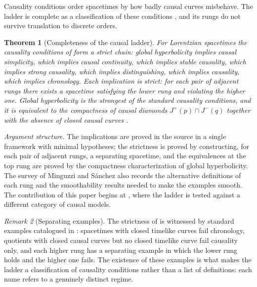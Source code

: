 \documentclass[11pt,letterpaper]{article}
\newtheorem{theorem}{Theorem}[section]
\theoremstyle{definition}
\theoremstyle{remark}
\newtheorem{remark}[theorem]{Remark}
\begin{document}
Causality conditions order spacetimes by how badly causal curves misbehave. The ladder is complete as a classification of these conditions \cite{minguzzisanchez}, and its rungs do not survive translation to discrete orders.

\begin{theorem}[Completeness of the causal ladder]\label{thm:ladder}
For Lorentzian spacetimes the causality conditions of  form a strict chain: global hyperbolicity implies causal simplicity, which implies causal continuity, which implies stable causality, which implies strong causality, which implies distinguishing, which implies causality, which implies chronology. Each implication is strict: for each pair of adjacent rungs there exists a spacetime satisfying the lower rung and violating the higher one. Global hyperbolicity is the strongest of the standard causality conditions, and it is equivalent to the compactness of causal diamonds $J^+(p) \cap J^-(q)$ together with the absence of closed causal curves \cite{minguzzisanchez}.
\end{theorem}

\par\medskip\noindent\emph{Argument structure.}
The implications are proved in the source in a single framework with minimal hypotheses; the strictness is proved by constructing, for each pair of adjacent rungs, a separating spacetime, and the equivalences at the top rung are proved by the compactness characterization of global hyperbolicity. The survey of Minguzzi and S\'{a}nchez also records the alternative definitions of each rung and the smoothability results needed to make the examples smooth. The contribution of this paper begins at , where the ladder is tested against a different category of causal models.
\par\medskip

\begin{remark}[Separating examples]\label{rem:separating}
The strictness of  is witnessed by standard examples catalogued in \cite{minguzzisanchez}: spacetimes with closed timelike curves fail chronology, quotients with closed causal curves but no closed timelike curve fail causality only, and each higher rung has a separating example in which the lower rung holds and the higher one fails. The existence of these examples is what makes the ladder a classification of causality conditions rather than a list of definitions: each name refers to a genuinely distinct regime.
\end{remark}
\end{document}
